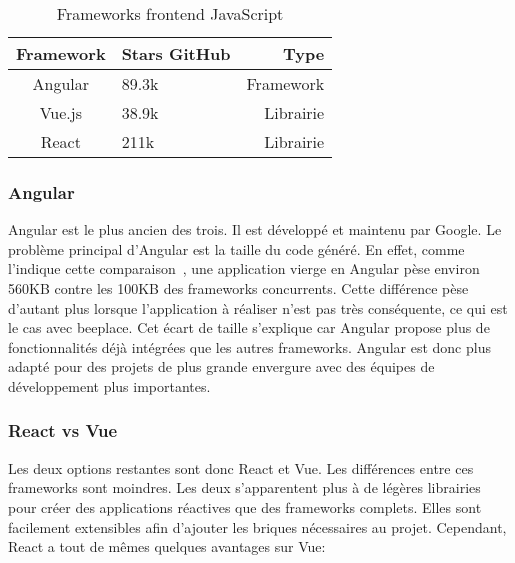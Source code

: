 \begin{table}[h]
  \begin{center}
    \caption{Frameworks frontend JavaScript}
    \label{tab:frameworks-frontend-js}
    \begin{tabular}{c|l|r}
      Framework & Stars GitHub       & Type      \\ \hline
      Angular   & 89.3k              & Framework \\
      Vue.js    & 38.9k\footnotemark & Librairie \\
      React     & 211k               & Librairie \\
    \end{tabular}
  \end{center}
\end{table}

\subsubsection{Angular}

Angular est le plus ancien des trois. Il est développé et maintenu par Google. Le problème principal d'Angular est la taille du code généré. En effet, comme l'indique cette comparaison~\cite{comparison-js-frameworks}, une application vierge en Angular pèse environ 560KB contre les 100KB des frameworks concurrents. Cette différence pèse d'autant plus lorsque l'application à réaliser n'est pas très conséquente, ce qui est le cas avec \gls{beeplace}. Cet écart de taille s'explique car Angular propose plus de fonctionnalités déjà intégrées que les autres frameworks. Angular est donc plus adapté pour des projets de plus grande envergure avec des équipes de développement plus importantes.

\subsubsection{React vs Vue}

Les deux options restantes sont donc React et Vue. Les différences entre ces frameworks sont moindres. Les deux s'apparentent plus à de légères librairies pour créer des applications réactives que des frameworks complets. Elles sont facilement extensibles afin d'ajouter les briques nécessaires au projet. Cependant, React a tout de mêmes quelques avantages sur Vue:

